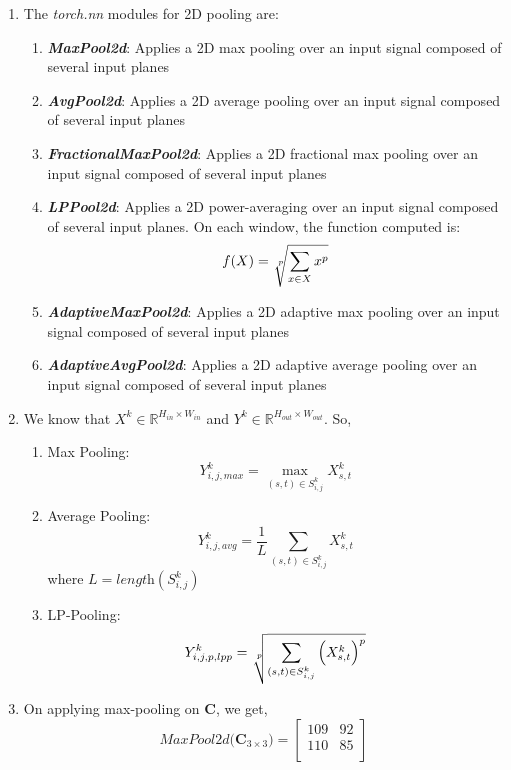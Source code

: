 \documentclass{article}
\begin{document}
\begin{enumerate}
    \item The \textit{torch.nn} modules for 2D pooling are: 
    \begin{enumerate}
        \item \textbf{\textit{MaxPool2d}}: Applies a 2D max pooling over an input signal composed of several input planes
        \item \textbf{\textit{AvgPool2d}}: Applies a 2D average pooling over an input signal composed of several input planes
        \item \textbf{\textit{FractionalMaxPool2d}}: Applies a 2D fractional max pooling over an input signal composed of several input planes
        \item \textbf{\textit{LPPool2d}}: Applies a 2D power-averaging over an input signal composed of several input planes. On each window, the function computed is: $$f(X)=\sqrt[\leftroot{-2}\uproot{2}p]{\sum_{x\in X}x^{p}}$$
        \item \textbf{\textit{AdaptiveMaxPool2d}}: Applies a 2D adaptive max pooling over an input signal composed of several input planes
        \item \textbf{\textit{AdaptiveAvgPool2d}}: Applies a 2D adaptive average pooling over an input signal composed of several input planes
    \end{enumerate}
    \item We know that $X^{k}\in \mathbb{R}^{H_{in}\times W_{in}}$ and $Y^{k}\in \mathbb{R}^{H_{out}\times W_{out}}$. So,
    \begin{enumerate}
        \item Max Pooling: $$Y_{i,j,max}^{k}=\max_{(s,t)\in S_{i,j}^{k}}X_{s,t}^{k}$$
        \item Average Pooling: $$Y_{i,j,avg}^{k}=\frac{1}{L}\sum_{(s,t)\in S_{i,j}^{k}}X_{s,t}^{k}$$ where $L=\textit{length}(S_{i,j}^{k})$
        \item LP-Pooling: $$Y_{i,j,p,lpp}^{k}=\sqrt[\leftroot{-2}\uproot{2}p]{\sum_{(s,t)\in S_{i,j}^{k}}\Big(X_{s,t}^{k}\Big)^{p}}$$
    \end{enumerate}
    \item On applying max-pooling  on $\textbf{C}$, we get,
    \begin{equation}
        MaxPool2d\big(\textbf{C}_{3\times 3}\big) = \begin{bmatrix}
            109&92\\
            110&85\\
        \end{bmatrix}

\end{equation}
\end{enumerate}
\end{document}

